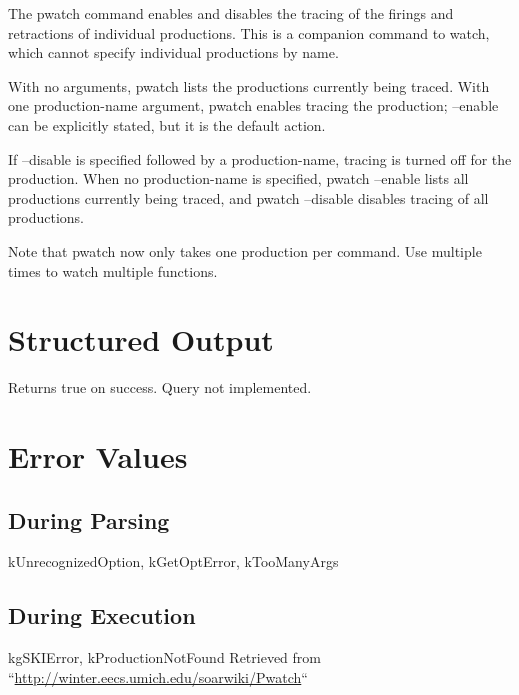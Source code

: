 \documentclass[10pt]{article}
\begin{document}
 The pwatch command enables and disables the tracing of the firings and retractions of individual productions. This is a companion command to watch, which cannot specify individual productions by name. 


 With no arguments, pwatch lists the productions currently being traced. With one production-name argument, pwatch enables tracing the production; --enable can be explicitly stated, but it is the default action. 


 If --disable is specified followed by a production-name, tracing is turned off for the production. When no production-name is specified, pwatch --enable lists all productions currently being traced, and pwatch --disable disables tracing of all productions. 


 Note that pwatch now only takes one production per command. Use multiple times to watch multiple functions. 
\section*{ Structured Output }


 Returns true on success. Query not implemented. 
\section*{ Error Values }
\subsection*{ During Parsing }


 kUnrecognizedOption, kGetOptError, kTooManyArgs
\subsection*{ During Execution }


 kgSKIError, kProductionNotFound Retrieved from ``\url{http://winter.eecs.umich.edu/soarwiki/Pwatch}``
\end{document}
